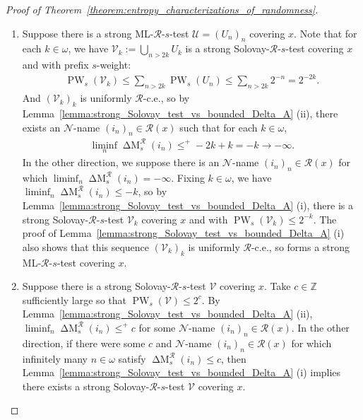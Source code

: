 \begin{proof}[Proof of Theorem~\ref{theorem:entropy_characterizations_of_randomness}]
\begin{enumerate}[label = (\roman*)]
        \begin{align*}
            \mathcal{V} := \set{i \in \omega}{\operatorname{\Delta P}^{\mathscr{R}}_s(i_n) < c}
        \end{align*}
        is an $\mathscr{R}$-c.e. set which covers $x$ via $(i_n)_n$. We confirm that $\mathcal{V}$ is a Solovay-$\mathscr{R}$-$s$-test using the Kraft Inequality~\ref{theorem:kraft_inequality}:
        \begin{align*}
            \operatorname{DW}_s(\mathcal{V}) = \sum_{i \in \mathcal{V}} \diam(i)^s \leq \sum_{i \in \mathcal{V}} 2^{c - K^{\mathscr{R}}(i)} \leq 2^c < +\infty.
        \end{align*}
        \item Suppose there is a strong ML-$\mathscr{R}$-$s$-test $\mathcal{U} = (U_n)_n$ covering $x$. Note that for each $k \in \omega$, we have $\mathcal{V}_k := \bigcup_{n > 2k} U_k$ is a strong Solovay-$\mathscr{R}$-$s$-test covering $x$ and with prefix $s$-weight:
        \begin{align*}
            \operatorname{PW}_s(\mathcal{V}_k) \leq \sum_{n > 2k} \operatorname{PW}_s(U_n) \leq \sum_{n > 2k} 2^{-n} = 2^{-2k}.
        \end{align*}
        And $(\mathcal{V}_k)_k$ is uniformly $\mathscr{R}$-c.e., so by Lemma~\ref{lemma:strong_Solovay_test_vs_bounded_Delta_A} (ii), there exists an $\mathcal{N}$-name $(i_n)_n \in \mathcal{R}(x)$ such that for each $k \in \omega$,
        \begin{align*}
            \liminf_n \operatorname{\Delta M}^{\mathscr{R}}_s(i_n) \leq^+ -2k + k = -k \to -\infty.
        \end{align*}
        In the other direction, we suppose there is an $\mathcal{N}$-name $(i_n)_n \in \mathcal{R}(x)$ for which $\liminf_n \operatorname{\Delta M}^{\mathscr{R}}_s(i_n) = - \infty$. Fixing $k \in \omega$, we have $\liminf_n \operatorname{\Delta M}^{\mathscr{R}}_s(i_n) \leq -k$, so by Lemma~\ref{lemma:strong_Solovay_test_vs_bounded_Delta_A} (i), there is a strong Solovay-$\mathscr{R}$-$s$-test $\mathcal{V}_k$ covering $x$ and with $\operatorname{PW}_s(\mathcal{V}_k) \leq 2^{-k}$. The proof of Lemma~\ref{lemma:strong_Solovay_test_vs_bounded_Delta_A} (i) also shows that this sequence $(\mathcal{V}_k)_k$ is uniformly $\mathscr{R}$-c.e., so forms a strong ML-$\mathscr{R}$-$s$-test covering $x$.
        \item Suppose there is a strong Solovay-$\mathscr{R}$-$s$-test $\mathcal{V}$ covering $x$. Take $c \in \mathbb{Z}$ sufficiently large so that $\operatorname{PW}_s(\mathcal{V}) \leq 2^c$. By Lemma~\ref{lemma:strong_Solovay_test_vs_bounded_Delta_A} (ii), $\liminf_n \operatorname{\Delta M}^{\mathscr{R}}_s(i_n) \leq^+ c$ for some $\mathcal{N}$-name $(i_n)_n \in \mathcal{R}(x)$. In the other direction, if there were some $c$ and $\mathcal{N}$-name $(i_n)_n \in \mathcal{R}(x)$ for which infinitely many $n \in \omega$ satisfy $\operatorname{\Delta M}^{\mathscr{R}}_s(i_n) \leq c$, then Lemma~\ref{lemma:strong_Solovay_test_vs_bounded_Delta_A} (i) implies there exists a strong Solovay-$\mathscr{R}$-$s$-test $\mathcal{V}$ covering $x$. 

\end{enumerate}
\end{proof}
